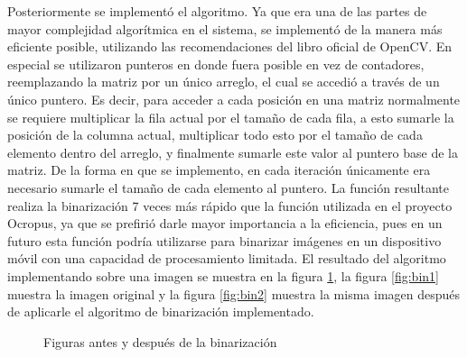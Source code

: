 \documentclass[a4paper, 11pt, oneside]{report}
\begin{document}
Posteriormente se implementó el algoritmo. Ya que era una de las partes de mayor complejidad algorítmica en el sistema, se implementó de la manera más eficiente posible, utilizando las recomendaciones del libro oficial de OpenCV. En especial se utilizaron punteros en donde fuera posible en vez de contadores, reemplazando la matriz por un único arreglo, el cual se accedió a través de un único puntero. Es decir, para acceder a cada posición en una matriz normalmente se requiere multiplicar la fila actual por el tamaño de cada fila, a esto sumarle la posición de la columna actual, multiplicar todo esto por el tamaño de cada elemento dentro del arreglo, y finalmente sumarle este valor al puntero base de la matriz. De la forma en que se implemento, en cada iteración únicamente era necesario sumarle el tamaño de cada elemento al puntero. La función resultante realiza la binarización 7 veces más rápido que la función utilizada en el proyecto Ocropus, ya que se prefirió darle mayor importancia a la eficiencia, pues en un futuro esta función podría utilizarse para binarizar imágenes en un dispositivo móvil con una capacidad de procesamiento limitada. El resultado del algoritmo implementando sobre una imagen se muestra en la figura \ref{fig:binarization}, la figura \ref{fig:bin1} muestra la imagen original y la figura \ref{fig:bin2} muestra la misma imagen después de aplicarle el algoritmo de binarización implementado.

	\begin{figure}
	\centering
	\caption{Figuras antes y después de la binarización}
	\label{fig:binarization}
	\end{figure}
\end{document}
